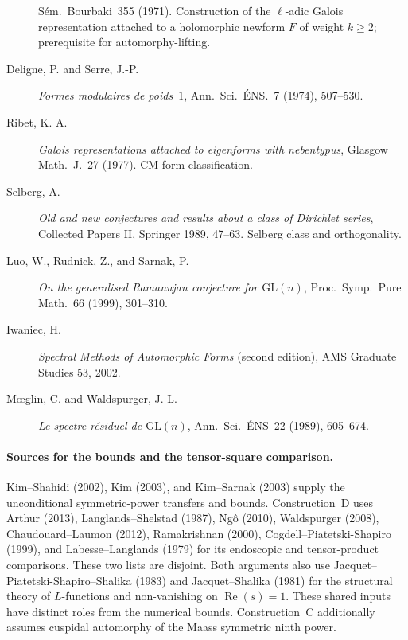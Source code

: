 \begin{description}
S\'em.~Bourbaki~355 (1971). Construction of the \(\ell\)-adic Galois
representation attached to a holomorphic newform \(F\) of weight
\(k\geq 2\); prerequisite for automorphy-lifting.
\item[Deligne, P. and Serre, J.-P.]
\emph{Formes modulaires de poids~\(1\)}, Ann.~Sci.~\'ENS.~7 (1974), 507--530.
\item[Ribet, K. A.]
\emph{Galois representations attached to eigenforms with nebentypus},
Glasgow Math.~J.~27 (1977). CM form classification.
\item[Selberg, A.]
\emph{Old and new conjectures and results about a class of Dirichlet
series}, Collected Papers II, Springer 1989, 47--63. Selberg class and
orthogonality.
\item[Luo, W., Rudnick, Z., and Sarnak, P.]
\emph{On the generalised Ramanujan conjecture for \(\mathrm{GL}(n)\)},
Proc.~Symp.~Pure Math.~66 (1999), 301--310.
\item[Iwaniec, H.]
\emph{Spectral Methods of Automorphic Forms} (second edition), AMS
Graduate Studies 53, 2002.
\item[M\oe glin, C. and Waldspurger, J.-L.]
\emph{Le spectre r\'esiduel de \(\mathrm{GL}(n)\)},
Ann.~Sci.~\'ENS~22 (1989), 605--674.
\end{description}

\paragraph{Sources for the bounds and the tensor-square comparison.}
Kim--Shahidi (2002), Kim (2003), and Kim--Sarnak (2003) supply the
unconditional symmetric-power transfers and bounds.
Construction~D uses Arthur (2013), Langlands--Shelstad (1987),
Ng\^o (2010), Waldspurger (2008), Chaudouard--Laumon (2012),
Ramakrishnan (2000), Cogdell--Piatetski-Shapiro (1999), and
Labesse--Langlands (1979) for its endoscopic and tensor-product
comparisons. These two lists are disjoint.
Both arguments also use Jacquet--Piatetski-Shapiro--Shalika (1983)
and Jacquet--Shalika (1981) for the structural theory of
\(L\)-functions and non-vanishing on \(\operatorname{Re}(s)=1\).
These shared inputs have distinct roles from the numerical bounds.
Construction~C additionally assumes cuspidal automorphy of the
Maass symmetric ninth power.
